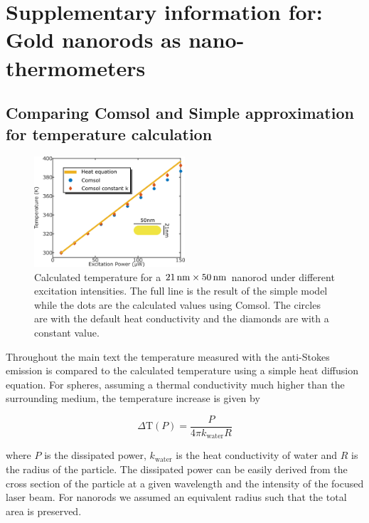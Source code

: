 \chapter[Gold nanorods as nano-thermometers]{Supplementary information for: Gold
nanorods as nano-thermometers}
\label{ch:SAntiStokes}

\newpage

\section{Comparing Comsol and Simple approximation for temperature calculation}
\begin{figure}[htp] \centering
\includegraphics[width=0.5\textwidth]{Chapters/04_Anti-Stokes/Figures/Supplementary/03_Compare_Comsol/03_Compare_Comsol.png}
\caption{Calculated temperature for a $21\,\textrm{nm}\times 50\,\textrm{nm}$ nanorod under
different excitation intensities. The full line is the result of the simple
model while the dots are the calculated values using Comsol. The circles are
with the default heat conductivity and the diamonds are with a constant value.}
	\label{fig:Compare-Comsol}
\end{figure}

Throughout the main text the temperature measured with the anti-Stokes emission
is compared to the calculated temperature using a simple heat diffusion
equation. For spheres, assuming a thermal conductivity much higher than the
surrounding medium, the temperature increase is given by

\begin{equation}
	\Delta \textrm{T}(P) = \frac{P}{4\pi k_{\textrm{water}} R}
\end{equation}

\noindent where $P$ is the dissipated power, $k_{\textrm{water}}$ is the heat
conductivity of water and $R$ is the radius of the particle. The dissipated power can be
easily derived from the cross section of the particle at a given wavelength and
the intensity of the focused laser beam. For nanorods we assumed an
equivalent radius such that the total area is preserved.

